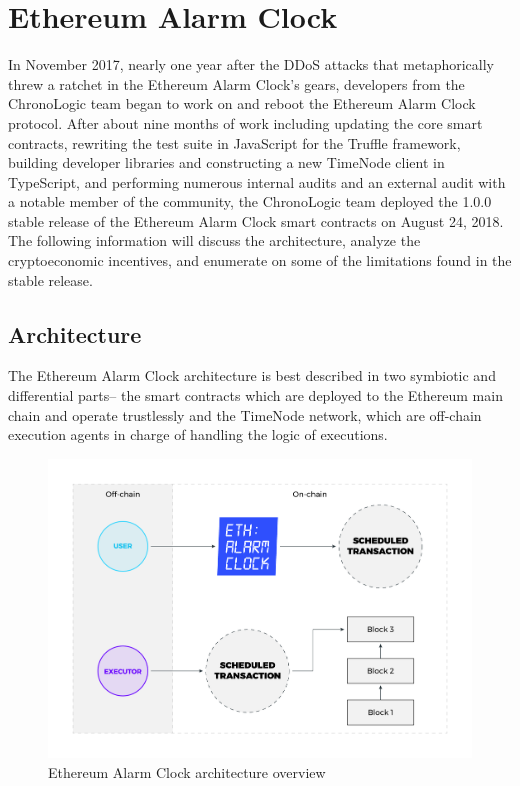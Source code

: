 \documentclass{report}
\begin{document}
  \chapter{Ethereum Alarm Clock}
  In November 2017, nearly one year after the DDoS attacks that metaphorically threw a ratchet in the Ethereum Alarm Clock’s gears, developers from the ChronoLogic team began to work on and reboot the Ethereum Alarm Clock protocol. After about nine months of work including updating the core smart contracts, rewriting the test suite in JavaScript for the Truffle framework, building developer libraries and constructing a new TimeNode client in TypeScript, and performing numerous internal audits and an external audit with a notable member of the community, the ChronoLogic team deployed the 1.0.0 stable release of the Ethereum Alarm Clock smart contracts on August 24, 2018. The following information will discuss the architecture, analyze the cryptoeconomic incentives, and enumerate on some of the limitations found in the stable release.
  \section{Architecture}
  The Ethereum Alarm Clock architecture is best described in two symbiotic and differential parts-- the smart contracts which are deployed to the Ethereum main chain and operate trustlessly and the TimeNode network, which are off-chain execution agents in charge of handling the logic of executions.
  \begin{figure}[h]
  \includegraphics[width=\textwidth]{diagram6}
  \caption{Ethereum Alarm Clock architecture overview}
  \end{figure}
\end{document}
